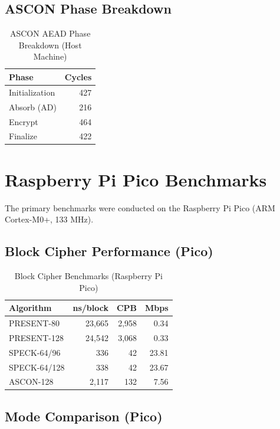 \documentclass[12pt]{report}
\begin{document}
\subsection{ASCON Phase Breakdown}

\begin{table}[H]
    \centering
    \begin{tabular}{lr}
        \hline
        \textbf{Phase} & \textbf{Cycles} \\
        \hline
        Initialization & 427 \\
        Absorb (AD) & 216 \\
        Encrypt & 464 \\
        Finalize & 422 \\
        \hline
    \end{tabular}
    \caption{ASCON AEAD Phase Breakdown (Host Machine)}
    \label{tab:ascon-phases}
\end{table}

\section{Raspberry Pi Pico Benchmarks}

The primary benchmarks were conducted on the Raspberry Pi Pico (ARM Cortex-M0+, 133 MHz).

\subsection{Block Cipher Performance (Pico)}

\begin{table}[H]
    \centering
    \begin{tabular}{lrrr}
        \hline
        \textbf{Algorithm} & \textbf{ns/block} & \textbf{CPB} & \textbf{Mbps} \\
        \hline
        PRESENT-80 & 23,665 & 2,958 & 0.34 \\
        PRESENT-128 & 24,542 & 3,068 & 0.33 \\
        SPECK-64/96 & 336 & 42 & 23.81 \\
        SPECK-64/128 & 338 & 42 & 23.67 \\
        ASCON-128 & 2,117 & 132 & 7.56 \\
        \hline
    \end{tabular}
    \caption{Block Cipher Benchmarks (Raspberry Pi Pico)}
    \label{tab:block-bench-pico}
\end{table}

\subsection{Mode Comparison (Pico)}
\end{document}
